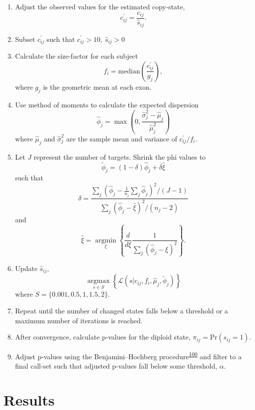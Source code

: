 \documentclass[11pt,letterpaper]{book}
\begin{document}
\begin{enumerate}
\def\labelenumi{\arabic{enumi}.}
\item
  Adjust the observed values for the estimated copy-state,
  \[
    c_{ij}^{\prime} = \frac{c_{ij}}{\hat{s}_{ij}}.
    \]
\item
  Subset \(c_{ij}^{\prime}\) such that \(c_{ij}^{\prime} > 10, ~ \hat{s}_{ij} > 0\)
\item
  Calculate the size-factor for each subject
  \[
    f_i = \text{median}\left(\frac{c_{ij}^{\prime}}{g_j}\right),
    \]
  where \(g_j\) is the geometric mean at each exon.
\item
  Use method of moments to calculate the expected dispersion
  \[
    \hat\phi_j = \max\left(0, \frac{\hat\sigma_j^2 - \hat{\mu}_j}{\hat{\mu}_j^2}\right)
    \]
  where \(\hat{\mu}_j\) and \(\hat{\sigma}_j^2\) are the sample mean and variance of \(c_{ij}^{\prime}/f_i\).
\item
  Let \(J\) represent the number of targets. Shrink the phi values to
  \[
    \tilde\phi_j = (1 - \delta)\hat\phi_j + \delta\hat{\xi}
    \]
  such that
  \[
    \delta = \frac{\sum\limits_j\left(\hat\phi_j - \frac{1}{n_j}\sum\limits_j \hat\phi_j\right)^2/(J - 1)}
    {\sum\limits_j\left(\hat\phi_j - \hat{\xi}\right)^2/(n_j - 2)}
    \]
  and
  \[
    \hat{\xi} = \mathop{\text{argmin}}\limits_{\xi}\left\{
    \frac{d}{d\xi}\frac{1}{\sum\limits_j \left(\hat\phi_j - \xi\right)^2}
    \right\}.
    \]
\item
  Update \(\hat{s}_{ij}\),
  \[
    \mathop{\text{argmax}}\limits_{s \in S}\left\{
    \mathcal{L}(s \rvert c_{ij},f_i,\hat\mu_j,\tilde\phi_j)
    \right\}
    \]
  where \(S = \{0.001, 0.5, 1, 1.5, 2\}\).
\item
  Repeat until the number of changed states falls below a threshold or a maximum number of iterations is reached.
\item
  After convergence, calculate p-values for the diploid state, \(\pi_{ij} = \text{Pr}(s_{ij} = 1)\).
\item
  Adjust p-values using the Benjamini--Hochberg procedure\textsuperscript{\protect\hyperlink{ref-benjamini:1995aa}{100}} and filter to a final call-set such that adjusted p-values fall below some threshold, \(\alpha\).
\end{enumerate}

\hypertarget{results}{%
\section{Results}\label{results}}
\end{document}
